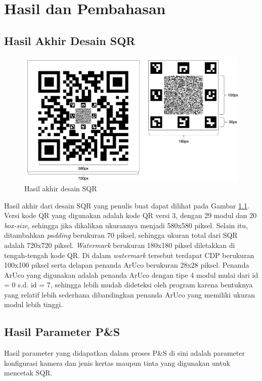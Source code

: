 \chapter{Hasil dan Pembahasan}

\section{Hasil Akhir Desain SQR}

\begin{figure}[h]
	\centering
	\includegraphics[width=12cm]{contents/chapter-4/4-modelsqrfinal.png}
	\caption{Hasil akhir desain SQR}
	\label{Fig: 4-modelsqrfinal}
\end{figure}

Hasil akhir dari desain SQR yang penulis buat dapat dilihat pada Gambar \ref{Fig: 4-modelsqrfinal}. Versi kode QR yang digunakan adalah kode QR versi 3, dengan
29 modul dan 20 \emph{box-size}, sehingga jika dikalikan ukurannya menjadi 580x580 piksel. Selain itu, ditambahkan \emph{padding} berukuran 70 piksel, sehingga
ukuran total dari SQR adalah 720x720 piksel. \emph{Watermark} berukuran 180x180 piksel diletakkan di tengah-tengah kode QR. Di dalam \emph{watermark} tersebut
terdapat CDP berukuran 100x100 piksel serta delapan penanda ArUco berukuran 28x28 piksel. Penanda ArUco yang digunakan adalah penanda ArUco dengan tipe 4 modul
mulai dari id = 0 s.d. id = 7, sehingga lebih mudah dideteksi oleh program karena bentuknya yang relatif lebih sederhana dibandingkan penanda ArUco yang
memiliki ukuran modul lebih tinggi.

\section{Hasil Parameter P\&S}
Hasil parameter yang didapatkan dalam proses P\&S di sini adalah parameter konfigurasi kamera dan jenis kertas maupun tinta yang digunakan untuk mencetak SQR.
